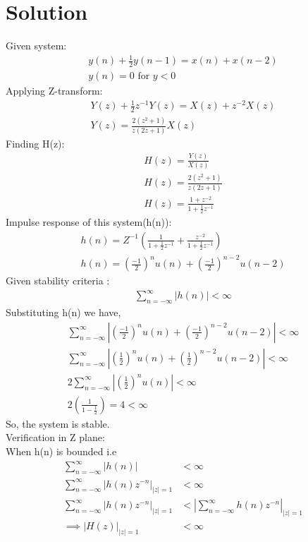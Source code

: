 \documentclass[journal,12pt,twocolumn]{IEEEtran}
\begin{document}
\section{Solution}
Given system: 
\begin{align}
\label{eq:system}
y(n)+\frac{1}{2}y(n-1) = x(n)+x(n-2) \\
y(n)=0 \text{ for }y<0
\end{align}
Applying Z-transform:
\begin{align}
Y(z) + \frac{1}{2}z^{-1}Y(z)=X(z) + z^{-2}X(z)\\
Y(z)=\frac{2(z^2+1)}{z(2z+1)}X(z)
\end{align}
Finding H(z):
\begin{align}
H(z) = \frac{Y(z)}{X(z)}\\
H(z) = \frac{2(z^2+1)}{z(2z+1)} \\
H(z) = \frac{1+z^{-2}}{1+\frac{1}{2}z^{-1}}
\end{align}
Impulse response of this system(h(n)):
\begin{align}
    h(n)= Z^{-1}(\frac{1}{1+\frac{1}{2}z^{-1}} + \frac{z^{-2}}{1+\frac{1}{2}z^{-1}})\\
    h(n)=(\frac{-1}{2})^nu(n) + (\frac{-1}{2})^{n-2}u(n-2)
\end{align}
Given stability criteria :
\begin{align}
\sum_{n=-\infty}^{\infty}{|h(n)|} < \infty
\end{align}
Substituting h(n) we have,
\begin{align}
\sum_{n=-\infty}^{\infty}{|(\frac{-1}{2})^nu(n) + (\frac{-1}{2})^{n-2}u(n-2)|} < \infty \\
\sum_{n=-\infty}^{\infty}{|(\frac{1}{2})^nu(n) + (\frac{1}{2})^{n-2}u(n-2)|} < \infty \\
2\sum_{n=-\infty}^{\infty}{|(\frac{1}{2})^nu(n)|} < \infty \\
2(\frac{1}{1-\frac{1}{2}}) = 4 < \infty
\end{align}
So, the system is stable.\\
Verification in Z plane:\\ 
When h(n) is bounded i.e
\begin{align}
\sum_{n=-\infty}^{\infty} |h(n)|  &< \infty \\
\sum_{n=-\infty}^{\infty}|h(n)z^{-n}|_{|z|=1}&<\infty \\
\sum_{n=-\infty}^{\infty}|h(n)z^{-n}|_{|z|=1}&<|\sum_{n=-\infty}^{\infty}h(n)z^{-n}|_{|z|=1} \\
\implies |H(z)|_{|z|=1}&<\infty 
\end{align}
\end{document}
